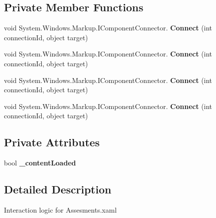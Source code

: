 \subsection*{Private Member Functions}
\begin{DoxyCompactItemize}
\item 
\mbox{\label{class_t_h_b___plugin___lesson_1_1_assesments_a42de142372ed19e056c775d8a76afd61}} 
void System.\+Windows.\+Markup.\+I\+Component\+Connector. {\bfseries Connect} (int connection\+Id, object target)
\item 
\mbox{\label{class_t_h_b___plugin___lesson_1_1_assesments_a42de142372ed19e056c775d8a76afd61}} 
void System.\+Windows.\+Markup.\+I\+Component\+Connector. {\bfseries Connect} (int connection\+Id, object target)
\item 
\mbox{\label{class_t_h_b___plugin___lesson_1_1_assesments_a42de142372ed19e056c775d8a76afd61}} 
void System.\+Windows.\+Markup.\+I\+Component\+Connector. {\bfseries Connect} (int connection\+Id, object target)
\item 
\mbox{\label{class_t_h_b___plugin___lesson_1_1_assesments_a42de142372ed19e056c775d8a76afd61}} 
void System.\+Windows.\+Markup.\+I\+Component\+Connector. {\bfseries Connect} (int connection\+Id, object target)
\end{DoxyCompactItemize}
\subsection*{Private Attributes}
\begin{DoxyCompactItemize}
\item 
\mbox{\label{class_t_h_b___plugin___lesson_1_1_assesments_a7d1e1622fba92126d0eec09b6da498b1}} 
bool {\bfseries \+\_\+content\+Loaded}
\end{DoxyCompactItemize}


\subsection{Detailed Description}
Interaction logic for Assesments.\+xaml 

